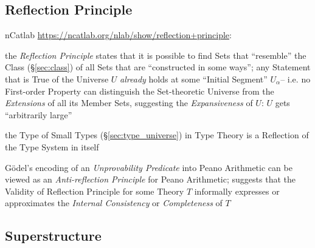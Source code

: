 \subsection{Reflection Principle}\label{sec:reflection_principle}

nCatlab \url{https://ncatlab.org/nlab/show/reflection+principle}:

the \emph{Reflection Principle} states that it is possible to find
Sets that ``resemble'' the Class (\S\ref{sec:class}) of all Sets that
are ``constructed in some ways''; any Statement that is True of the
Universe $U$ \emph{already} holds at some ``Initial Segment''
$U_\alpha$-- i.e. no First-order Property can distinguish the
Set-theoretic Universe from the \emph{Extensions} of all its Member
Sets, suggesting the \emph{Expansiveness} of $U$: $U$ gets
``arbitrarily large''


the Type of Small Types (\S\ref{sec:type_universe}) in Type Theory is
a Reflection of the Type System in itself

G\"odel's encoding of an \emph{Unprovability Predicate} into Peano
Arithmetic can be viewed as an \emph{Anti-reflection Principle} for
Peano Arithmetic; suggests that the Validity of Reflection Principle
for some Theory $T$ informally expresses or approximates the
\emph{Internal Consistency} or \emph{Completeness} of $T$



\subsection{Superstructure}\label{sec:superstructure}

